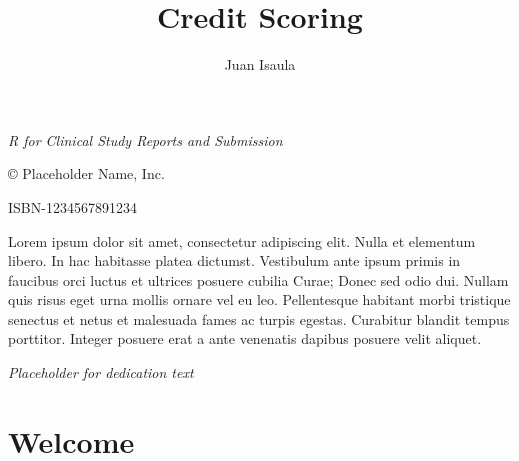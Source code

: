 \documentclass[
  letterpaper,
]{tex/svmono}
\title{Credit Scoring}
\author{Juan Isaula}
\date{}
\renewcommand*\contentsname{Table of contents}
\newcommand\contentsname{Table of contents}
\begin{document}
\maketitle
\null\vfill
\begin{flushleft}
\thispagestyle{empty}
\textit{R for Clinical Study Reports and Submission}

© Placeholder Name, Inc.

ISBN-1234567891234

\noindent Lorem ipsum dolor sit amet, consectetur adipiscing elit.
Nulla et elementum libero. In hac habitasse platea dictumst.
Vestibulum ante ipsum primis in faucibus orci luctus et ultrices
posuere cubilia Curae; Donec sed odio dui. Nullam quis risus eget
urna mollis ornare vel eu leo. Pellentesque habitant morbi tristique
senectus et netus et malesuada fames ac turpis egestas.
Curabitur blandit tempus porttitor.
Integer posuere erat a ante venenatis dapibus posuere velit aliquet.
\end{flushleft}

\frontmatter

\begin{center}
    \thispagestyle{empty}
    \vspace*{\fill}
    \huge{\textit{Placeholder for dedication text}}
    \vspace*{\fill}
\end{center}

\mainmatter

\ifdefined\Shaded\renewenvironment{Shaded}{\begin{tcolorbox}[interior hidden, sharp corners, enhanced, frame hidden, boxrule=0pt, borderline west={3pt}{0pt}{shadecolor}, breakable]}{\end{tcolorbox}}\fi

\renewcommand*\contentsname{Table of contents}
{
\hypersetup{linkcolor=}
\setcounter{tocdepth}{2}
\tableofcontents
}

\hypertarget{welcome}{%
\chapter*{Welcome}\label{welcome}}

\end{document}
